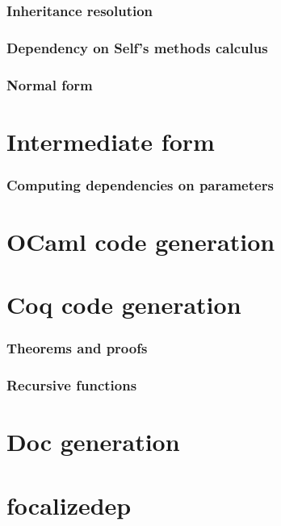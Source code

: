 \documentclass{book}
\begin{document}
\subsection{Inheritance resolution}
\subsection{Dependency on Self's methods calculus}
\subsection{Normal form}

\chapter{Intermediate form}
\subsection{Computing dependencies on parameters}

\chapter{OCaml code generation}

\chapter{Coq code generation}
\subsection{Theorems and proofs}
\subsection{Recursive functions}

\chapter{Doc generation}

\chapter{focalizedep}
\end{document}
